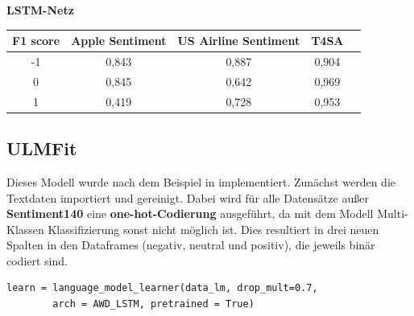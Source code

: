 \textbf{LSTM-Netz}
\begin{center}
\begin{tabular}{|c||c|c|c|c|}
\hline
F1 score & Apple Sentiment & US Airline Sentiment & T4SA\\ 
\hline\hline
-1 & 0,843 & 0,887 & 0,904\\
\hline
0 & 0,845 & 0,642 & 0,969\\ 
\hline
1 & 0,419 & 0,728 & 0,953\\
\hline    
\end{tabular}
\end{center}

\subsection{ULMFit}
Dieses Modell wurde nach dem Beispiel in \cite{ulm_model} implementiert. Zun\"achst werden die Textdaten importiert und gereinigt. Dabei wird f\"ur alle Datens\"atze au{\ss}er \textbf{Sentiment140} eine \textbf{one-hot-Codierung} ausgef\"uhrt, da mit dem Modell Multi-Klassen Klassifizierung sonst nicht m\"oglich ist. Dies resultiert in drei neuen Spalten in den Dataframes (negativ, neutral und positiv), die jeweils bin\"ar codiert sind.\\

\lstset{language=Python}
\lstset{frame=lines}
\lstset{captionpos=b}
\lstset{basicstyle=\footnotesize}
\begin{lstlisting}
learn = language_model_learner(data_lm, drop_mult=0.7, 
		arch = AWD_LSTM, pretrained = True)
\end{lstlisting}

